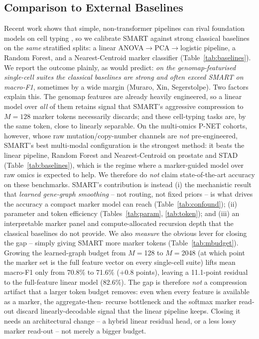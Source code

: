 \documentclass[letterpaper]{article}
\begin{document}
\subsection{Comparison to External Baselines}
\label{sec:baselines}
Recent work shows that simple, non-transformer pipelines can rival foundation models on
cell typing \cite{souza2024linear}, so we calibrate SMART against strong classical
baselines on the \emph{same} stratified splits: a linear ANOVA$\to$PCA$\to$logistic
pipeline, a Random Forest, and a Nearest-Centroid marker classifier
(Table~\ref{tab:baselines}). We report the outcome plainly, as \cite{souza2024linear}
would predict: \emph{on the genomap-featurised single-cell suites the classical baselines
are strong and often exceed SMART on macro-F1}, sometimes by a wide margin (Muraro, Xin,
Segerstolpe). Two factors explain this. The genomap features are already heavily
engineered, so a linear model over \emph{all} of them retains signal that SMART's
aggressive compression to $M{=}128$ marker tokens necessarily discards; and these
cell-typing tasks are, by the same token, close to linearly separable. On the multi-omics
P-NET cohorts, however, whose raw mutation/copy-number channels are \emph{not}
pre-engineered, SMART's best multi-modal configuration is the strongest method: it beats
the linear pipeline, Random Forest and Nearest-Centroid on prostate and STAD
(Table~\ref{tab:baselines}), which is the regime where a marker-guided model over raw omics
is expected to help. We therefore
do \emph{not} claim state-of-the-art accuracy on these benchmarks. SMART's contribution is
instead (i) the mechanistic result that \emph{learned gene-graph smoothing} -- not
routing, not fixed priors -- is what drives the accuracy a compact marker model can reach
(Table~\ref{tab:confound}); (ii) parameter and token efficiency (Tables~\ref{tab:param},
\ref{tab:token}); and (iii) an interpretable marker panel and compute-allocated recursion
depth that the classical baselines do not provide. We also \emph{measure} the obvious
lever for closing the gap -- simply giving SMART more marker tokens
(Table~\ref{tab:mbudget}). Growing the learned-graph budget from $M{=}$128 to
$M{=}$2048 (at which point the marker set is the full feature vector on every
single-cell suite) lifts mean macro-F1 only from 70.8\% to 71.6\%
($+$0.8 points), leaving a 11.1-point residual to the full-feature linear
model (82.6\%). The gap is therefore \emph{not} a compression artifact that a larger
token budget removes: even when every feature is available as a marker, the aggregate-then-
recurse bottleneck and the softmax marker read-out discard linearly-decodable signal that
the linear pipeline keeps. Closing it needs an architectural change -- a hybrid linear
residual head, or a less lossy marker read-out -- not merely a bigger budget.
\end{document}
